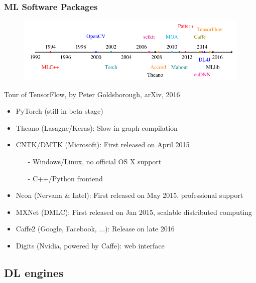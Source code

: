 \begin{frame}
  \MyLogo
  \frametitle{ML Software Packages}  

\vskip -10pt
\begin{figure}[htbp] %
   \centering
   \includegraphics[width=0.8\linewidth]{figures/ML.pdf} 
\end{figure}
\begin{center}
\vskip -8pt
{\color{red} \scriptsize
Tour of TensorFlow, by Peter Goldsborough, arXiv, 2016}
\end{center}

	\begin{itemize}\setlength\itemsep{0.25em}\footnotesize
	\item PyTorch (still in \alert{beta} stage)
	\item Theano (Lasagne/Keras): Slow in graph compilation
	\item CNTK/DMTK (Microsoft): First released on April 2015
		\begin{itemize}
		\item[-] Windows/Linux, no official OS X support
		\item[-] C++/Python frontend
		\end{itemize}
	\item Neon (Nervana \& Intel): First released on May 2015, professional support
	\item MXNet (DMLC): First released on Jan 2015, scalable distributed computing
	\item Caffe2 (Google, Facebook, ...): Release on late 2016
	\item Digits (Nvidia, powered by Caffe): web interface
	\end{itemize}

\end{frame}

\subsection{DL engines}

